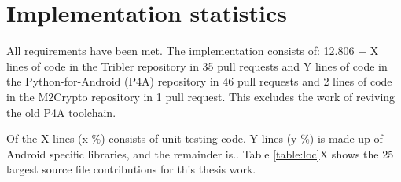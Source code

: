 \section{Implementation statistics}
All requirements have been met.
The implementation consists of:
12.806 + X lines of code in the Tribler repository in 35 pull requests and
Y lines of code in the Python-for-Android (P4A) repository in 46 pull requests and
2 lines of code in the M2Crypto repository in 1 pull request.
This excludes the work of reviving the old P4A toolchain.

Of the X lines (x \%) consists of unit testing code.
Y lines (y \%) is made up of Android specific libraries, and the remainder is..
Table \ref{table:loc}X shows the 25 largest source file contributions for this thesis work. 

